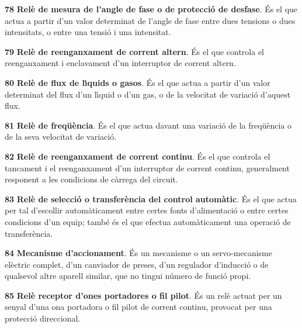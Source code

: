 \begin{multicols}{2}
\begin{list}{}
\item[\textbf{78}]  \textbf{Rel\`{e} de  mesura de l'angle de fase o de protecci\'{o}
de desfase}. \'{E}s el que actua a partir d'un valor determinat de
l'angle de fase entre dues tensions o dues intensitats, o entre una
tensi\'{o} i una intensitat.

\item[\textbf{79}]  \textbf{Rel\`{e} de
reenganxament de corrent altern}. \'{E}s el que controla el reenganxament i enclavament d'un
interruptor de corrent altern.

\item[\textbf{80}]  \textbf{Rel\`{e} de flux de l\'{\i}quids
o gasos}.
 \'{E}s el que actua a partir d'un valor determinat del flux d'un l\'{\i}quid o d'un gas, o de
 la  velocitat de variaci\'{o} d'aquest flux.

\item[\textbf{81}]  \textbf{Rel\`{e} de freq\"{u}\`{e}ncia}. \'{E}s el que actua
davant una variaci\'{o} de la freq\"{u}\`{e}ncia o de la seva velocitat de variaci\'{o}.

\item[\textbf{82}]  \textbf{Rel\`{e} de
reenganxament de corrent continu}. \'{E}s el que controla el tancament i el reenganxament d'un
interruptor de corrent continu, generalment responent a les condicions de c\`{a}rrega del
circuit.

\item[\textbf{83}] 
\textbf{Rel\`{e} de selecci\'{o} o transfer\`{e}ncia del control autom\`{a}tic}. \'{E}s
el que actua per tal d'escollir autom\`{a}ticament entre certes fonts
d'alimentaci\'{o} o entre certes condicions d'un equip; tamb\'{e} \'{e}s el que
efectua autom\`{a}ticament una operaci\'{o} de transfer\`{e}ncia.

\item[\textbf{84}]  \textbf{Mecanisme d'accionament}. \'{E}s un
mecanisme o un servo-mecanisme el\`{e}ctric complet,  d'un canviador de
preses, d'un regulador d'inducci\'{o} o de qualsevol altre aparell
similar, que no tingui n\'{u}mero de funci\'{o} propi.

\item[\textbf{85}]  \textbf{Rel\`{e}
receptor d'ones portadores o fil pilot}. \'{E}s un rel\`{e} actuat per un
senyal d'una ona portadora o fil pilot de corrent continu, provocat
per una protecci\'{o} direccional.


\end{list}
\end{multicols}
